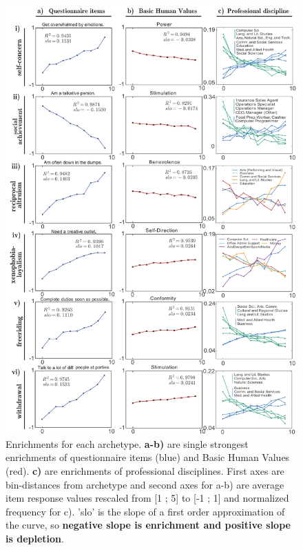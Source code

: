 \begin{figure}[!ht]
	\centering
	\includegraphics[width=1\textwidth]{figures/firstEnrichmentsQuestionnaireValues}
	\caption{\label{fig:firstEnrichmentsQuestionnaireValues} Enrichments for each archetype. \textbf{a-b)} are single strongest enrichments of questionnaire items ({\color{blue}blue}) and Basic Human Values ({\color{red}red}). \textbf{c)} are enrichments of professional disciplines. First axes are bin-distances from archetype and second axes for a-b) are average item response values rescaled from [1 ; 5] to [-1 ; 1] and normalized frequency for c). 'slo' is the slope of a first order approximation of the curve, so \textbf{negative slope is enrichment and positive slope is depletion}.}
\end{figure}

